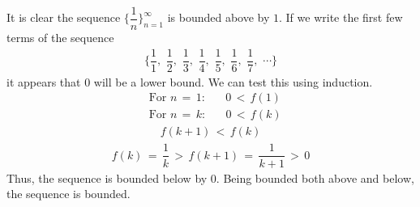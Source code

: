 \begin{example}
It is clear the sequence $\Big\{\dfrac{1}{n}\Big\}_{n=1}^{\infty}$ is bounded above by $1$. If we write the first few terms of the sequence
\begin{align*}
    \Big\{\dfrac{1}{1}, \hspace{4pt} \dfrac{1}{2}, \hspace{4pt} \dfrac{1}{3}, \hspace{4pt} \dfrac{1}{4}, \hspace{4pt} \dfrac{1}{5}, \hspace{4pt} \dfrac{1}{6}, \hspace{4pt} \dfrac{1}{7}, \hspace{4pt} \cdots \Big\}
\end{align*}
it appears that $0$ will be a lower bound. We can test this using induction.
\begin{align*}
    &\text{For} \hspace{4pt} n \hspace{2pt} = \hspace{2pt} 1: \hspace{20pt} 0 \hspace{2pt} < \hspace{2pt} f(1)\\[2ex]
    &\text{For} \hspace{4pt} n \hspace{2pt} = \hspace{2pt} k: \hspace{20pt} 0 \hspace{2pt} < \hspace{2pt} f(k) 
\end{align*}
\begin{align*}
    f(k+1) \hspace{2pt} < \hspace{2pt} f(k)
\end{align*}
\begin{align*}
    f(k) \hspace{2pt} = \hspace{2pt} \dfrac{1}{k} \hspace{2pt} > \hspace{2pt} f(k+1) \hspace{2pt} = \hspace{2pt} \dfrac{1}{k+1} \hspace{2pt} > \hspace{2pt} 0 
\end{align*}
Thus, the sequence is bounded below by $0$. Being bounded both above and below, the sequence is bounded.
\end{example}

